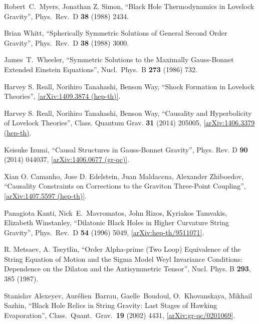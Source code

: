\documentclass[12pt]{article}
\newcommand{\2}{$^2$}
\newcommand{\3}{$^3$}
\newcommand{\4}{$_4$}
\newcommand{\5}{$_5$}
\begin{document}
\begin{thebibliography}{400}
  Robert~C.~Myers, Jonathan Z. Simon,
  ``Black Hole Thermodynamics in Lovelock Gravity'',
  Phys.\ Rev.\ D {\bf 38} (1988) 2434.

Brian Whitt,
  ``Spherically Symmetric Solutions of General Second Order Gravity'',
  Phys.\ Rev.\ D {\bf 38} (1988) 3000.

  James~T.~Wheeler,
  ``Symmetric Solutions to the Maximally Gauss-Bonnet Extended Einstein Equations'', 
  Nucl.\ Phys.\ B {\bf 273} (1986) 732.
		
Harvey S. Reall, Norihiro Tanahashi, Benson Way, ``Shock Formation in Lovelock Theories'', \href{http://arxiv.org/abs/1409.3874}{[arXiv:1409.3874 (hep-th)]}.

	Harvey S. Reall, Norihiro Tanahashi, Benson Way, ``Causality and Hyperbolicity of Lovelock Theories'',  Class. Quantum Grav. \textbf{31} (2014) 205005, \href{http://arxiv.org/abs/1406.3379}{[arXiv:1406.3379 (hep-th)}.

Keisuke Izumi, ``Causal Structures in Gauss-Bonnet Gravity'', 	Phys. Rev. D \textbf{90} (2014) 044037, \href{http://arxiv.org/abs/1406.0677}{[arXiv:1406.0677 (gr-qc)]}.

Xian O. Camanho, Jose D. Edelstein, Juan Maldacena, Alexander Zhiboedov, ``Causality Constraints on Corrections to the Graviton Three-Point Coupling'', \href{http://arxiv.org/abs/1407.5597}{[arXiv:1407.5597 (hep-th)]}.

Panagiota Kanti, Nick~E.~Mavromatos, John Rizos, Kyriakos Tamvakis, Elizabeth Winstanley,
  ``Dilatonic Black Holes in Higher Curvature String Gravity'', 
  Phys.\ Rev.\ D {\bf 54} (1996) 5049,
  \href{http://arxiv.org/abs/hep-th/9511071}{[arXiv:hep-th/9511071]}.

 R. Metsaev, A. Tseytlin, 
``Order Alpha-prime (Two Loop) Equivalence of the String Equation of Motion and the Sigma Model Weyl Invariance Conditions: Dependence on the Dilaton and the Antisymmetric Tensor'',
Nucl. Phys. B {\bf 293}, 385 (1987).

  Stanislav Alexeyev, Aur\'elien~Barrau, Gaelle~Boudoul, O.~Khovanskaya, Mikhail Sazhin,
  ``Black Hole Relics in String Gravity: Last Stages of Hawking Evaporation'',
  Class.\ Quant.\ Grav.\  {\bf 19} (2002) 4431, 
 \href{http://arxiv.org/abs/gr-qc/0201069}{[arXiv:gr-qc/0201069]}.


\end{thebibliography}
\end{document}

